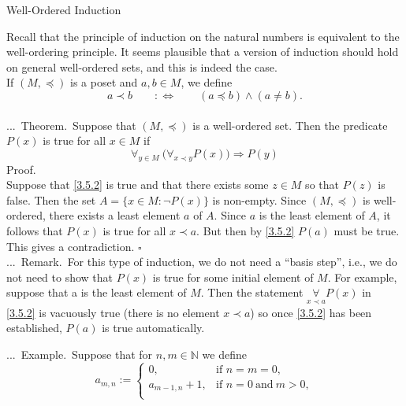 \documentclass[smaller,hyperref={CJKbookmarks=true}]{beamer}
\newcommand{\N}{\mathbb{N}} \newcommand{\Z}{\mathbb{Z}} \newcommand{\Q}{\mathbb{Q}}
\newenvironment{PROOF}{{\noindent\!\sf\alert{Proof.}}\\}{\hfill$\square$\\}
\newcounter{zhuo}[subsection]
\renewcommand{\thezhuo}{\thesection.\thesubsection.\arabic{zhuo}}
\newenvironment{REMARK}{\stepcounter{zhuo}\alert{\thezhuo.~Remark.\,}}{}
\newenvironment{EXAMPLE}{\stepcounter{zhuo}\alert{\!\thezhuo.~Example.\,}}{}
\newenvironment{THEOREM}{\stepcounter{zhuo}\alert{\thezhuo.~Theorem.\,}}{}
\begin{document}
\begin{frame}{Well-Ordered Induction}
\begin{spacing}{1.05}
Recall that the principle of induction on the natural numbers is equivalent
to the well-ordering principle. It seems plausible that a version of induction
should hold on general well-ordered sets, and this is indeed the case.\\[6pt]
If $(M,\preccurlyeq)$ is a poset and $a,b\in M$, we define
\[a\prec b\qquad:\Leftrightarrow\qquad (a\preccurlyeq b)\wedge(a\neq b).\]
 \\[9pt]
\begin{THEOREM}
Suppose that $(M,\preccurlyeq)$ is a well-ordered set. Then the predicate $P(x)$ is true for all $x\in M$ if
\begin{equation}\label{3.5.2}
\mathop{\forall}_{y\in M}~\Big(\mathop{\forall}_{x\prec y}P(x)\Big)\Rightarrow P(y)
\end{equation}
\end{THEOREM}
\newpage
\vspace*{12pt}
\begin{PROOF}
Suppose that \eqref{3.5.2} is true and that there exists some $z\in M$ so that $P(z)$ is false. Then the set $A=\{x\in M:\neg P(x)\}$ is non-empty. Since $(M,\preccurlyeq)$ is well-ordered, there exists a least element $a$ of $A$. Since $a$ is the least element of $A$, it follows that $P(x)$ is true for all $x\prec a$. But then by \eqref{3.5.2} $P(a)$ must be true. This gives a contradiction.
\end{PROOF}
\vspace*{7pt}
\begin{REMARK}
For this type of induction, we do not need a ``basis step'',
i.e., we do not need to show that $P(x)$ is true for some initial element of
$M$. For example, suppose that a is the least element of $M$. Then the statement $\mathop{\forall}\limits_{x\prec a}P(x)$ in \eqref{3.5.2} is vacuously true (there is no element $x\prec a$) so once \eqref{3.5.2} has been established, $P(a)$ is true automatically.
\end{REMARK}
\end{spacing}
\newpage
\begin{spacing}{1}
\begin{EXAMPLE}
Suppose that for $n,m\in\N$ we define
\[a_{m,n}:=\begin{cases}
             0, & \mbox{if } n=m=0, \\
             a_{m-1,n}+1, & \mbox{if } n=0~\text{and}~m>0, \\

\end{cases}\]
\end{EXAMPLE}
\end{spacing}
\end{frame}
\end{document}
